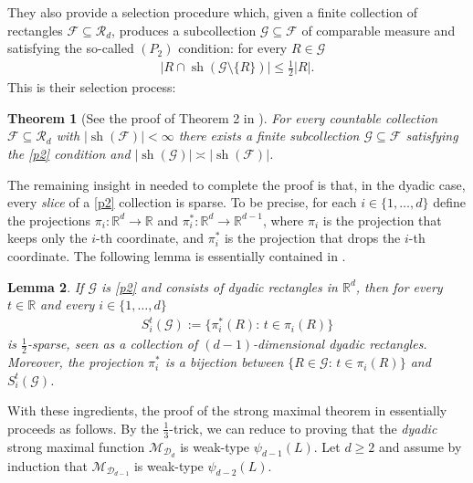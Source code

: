 \documentclass[oneside]{amsart}
\newtheorem{theorem}{Theorem}
\newtheorem{lemma}[theorem]{Lemma}
\theoremstyle{definition}
\theoremstyle{plain}
\numberwithin{equation}{section}
\numberwithin{theorem}{section}
\newcommand{\sh}{\operatorname{sh}}
\begin{document}
They also provide a selection procedure which, given a finite collection
of rectangles $\mathcal{F} \subseteq \mathcal{R}_d$, produces a
subcollection $\mathcal{G} \subseteq \mathcal{F}$ of comparable measure and
satisfying the so-called $(P_2)$ condition: for every $R \in \mathcal{G}$
\begin{align} \label{p2} \tag{$P_2$}
  |R \cap \sh(\mathcal{G} \setminus \{R\})| \leq \frac{1}{2}|R|.
\end{align}
This is their selection process:
\begin{theorem}[See the proof of Theorem 2 in \cite{CordobaFefferman1975}]
  \label{CF:Selection}
  For every countable collection $\mathcal{F} \subseteq \mathcal{R}_d$ with
  $|\sh(\mathcal{F})| < \infty$ there
  exists a finite subcollection $\mathcal{G} \subseteq \mathcal{F}$ satisfying
  the \eqref{p2} condition and
  $|\sh(\mathcal{G})| \asymp |\sh(\mathcal{F})|$.
\end{theorem}

The remaining insight in \cite{CordobaFefferman1975} needed to complete the
proof is that, in the dyadic case, every \emph{slice} of a \eqref{p2} collection
is sparse.
To be precise, for each $i \in \{1, \dots, d\}$ define the projections
$\pi_i : \mathbb{R}^d \to \mathbb{R}$ and $\pi_i^* : \mathbb{R}^d \to
\mathbb{R}^{d-1}$, where $\pi_i$ is the projection that keeps only the $i$-th
coordinate, and $\pi_i^*$ is the projection that drops the $i$-th coordinate.
The following lemma is essentially contained in \cite{CordobaFefferman1975}.
\begin{lemma}
  \label{CF:slices_of_p2}
  If $\mathcal{G}$ is \eqref{p2} and consists of dyadic rectangles in
  $\mathbb{R}^d$, then for every $t \in \mathbb{R}$ and every
  $i \in \{1, \dots, d\}$
  \begin{align*}
    S_i^t(\mathcal{G}) := \{\pi_i^*(R):\, t \in \pi_i(R)\}
  \end{align*}
  is $\frac{1}{2}$-sparse, seen as a collection of $(d-1)$-dimensional dyadic
  rectangles.
  Moreover, the projection $\pi_i^*$ is a bijection between
  $\{R \in \mathcal{G}:\, t \in \pi_i(R)\}$ and $S_i^t(\mathcal{G})$.
\end{lemma}

With these ingredients, the proof of the strong maximal theorem in
\cite{CordobaFefferman1975} essentially proceeds as follows.
By the $\frac{1}{3}$-trick, we can reduce to proving that the \emph{dyadic}
strong maximal function $\mathcal{M}_{\mathcal{D}_d}$ is weak-type
$\psi_{d-1}(L)$.
Let $d \geq 2$ and assume by induction that $\mathcal{M}_{\mathcal{D}_{d-1}}$
is weak-type $\psi_{d-2}(L)$.
\end{document}
